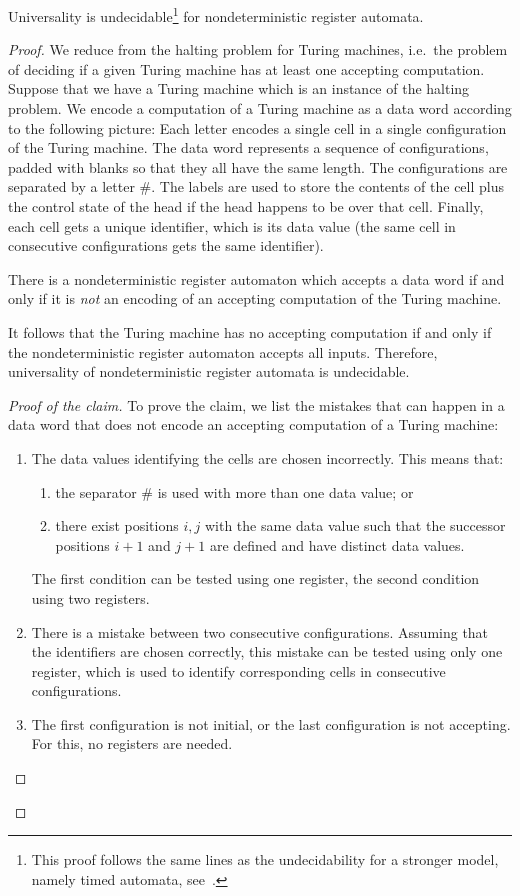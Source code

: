 \begin{theorem}\label{thm:register-undecidable-universality}Universality is undecidable\footnote{This proof follows the same lines as the undecidability for a stronger model, namely timed automata, see~\cite[Theorem 5.2]{alur_theory_1994}.} for nondeterministic register automata.
\end{theorem}
\begin{proof}
We reduce from the halting problem for Turing machines, i.e.~the problem of deciding if a given Turing machine has at least one accepting computation. Suppose that we have a Turing machine which is an instance of the halting problem. We encode a computation of a Turing machine as a data word according to the following picture:
Each letter encodes a single cell in a single configuration of the Turing machine. The data word represents a sequence of configurations, padded with blanks so that they all have the same length. The configurations are separated by a letter $\#$. The labels are used to store the contents of the cell plus the control state of the head if the head happens to be over that cell. Finally, each cell gets a unique identifier, which is its data value (the same cell in consecutive configurations gets the same identifier). 
\begin{claim}
There is a nondeterministic register automaton which accepts a data word if and only if it is \emph{not} an encoding of an accepting computation of the Turing machine.	
\end{claim}
It follows that the Turing machine has no accepting computation if and only if the nondeterministic register automaton accepts all inputs. Therefore, universality of nondeterministic register automata is undecidable.
\begin{proof}[Proof of the claim]
 To prove the claim, we list the mistakes that can happen in a data word that does not encode an accepting computation of a Turing machine:
\begin{enumerate}
	\item The data values identifying the cells are chosen incorrectly. This means that:
\begin{enumerate}
\item the separator $\#$ is used with more than one data value; or
\item there exist positions $i,j$ with the same data value such that the successor positions $i+1$ and $j+1$ are defined and have distinct data values.
\end{enumerate}
The first condition can be tested using one register, the second condition using two registers.
\item There is a mistake between two consecutive configurations. Assuming that the identifiers are chosen correctly, this mistake can be tested using only one register, which is used to identify corresponding cells in consecutive configurations.
\item The first configuration is not initial, or the last configuration is not accepting. For this, no registers are needed.
\end{enumerate}
\end{proof}
\end{proof}

